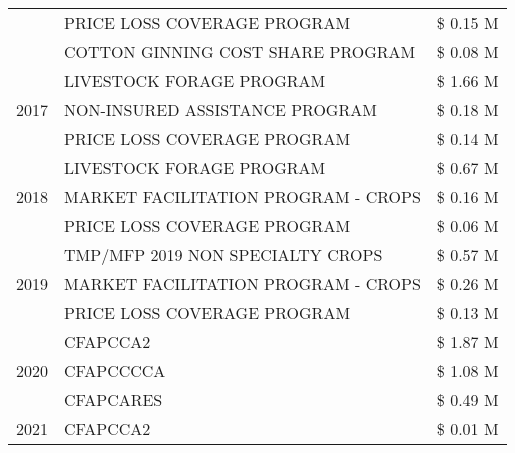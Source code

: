 \begin{tabular}{llr}
 & PRICE LOSS COVERAGE PROGRAM                   & \$ 0.15 M \\
 & COTTON GINNING COST SHARE PROGRAM             & \$ 0.08 M \\
\cline{1-3}
\multirow[t]{3}{*}{2017} & LIVESTOCK FORAGE PROGRAM & \$ 1.66 M \\
 & NON-INSURED ASSISTANCE PROGRAM & \$ 0.18 M \\
 & PRICE LOSS COVERAGE PROGRAM & \$ 0.14 M \\
\cline{1-3}
\multirow[t]{3}{*}{2018} & LIVESTOCK FORAGE PROGRAM & \$ 0.67 M \\
 & MARKET FACILITATION PROGRAM - CROPS & \$ 0.16 M \\
 & PRICE LOSS COVERAGE PROGRAM & \$ 0.06 M \\
\cline{1-3}
\multirow[t]{3}{*}{2019} & TMP/MFP 2019 NON SPECIALTY CROPS & \$ 0.57 M \\
 & MARKET FACILITATION PROGRAM - CROPS & \$ 0.26 M \\
 & PRICE LOSS COVERAGE PROGRAM & \$ 0.13 M \\
\cline{1-3}
\multirow[t]{3}{*}{2020} & CFAPCCA2 & \$ 1.87 M \\
 & CFAPCCCCA & \$ 1.08 M \\
 & CFAPCARES & \$ 0.49 M \\
\cline{1-3}
2021 & CFAPCCA2 & \$ 0.01 M \\
\cline{1-3}
\bottomrule
\end{tabular}
